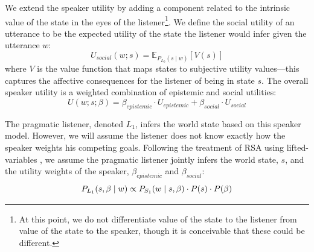 \documentclass[10pt,letterpaper]{article}
\newcommand{\denote}[1]{\mbox{ $[\![ #1 ]\!]$}}
\newcommand{\ndg}[1]{\textcolor{Green}{[ndg: #1]}}
\begin{document}
We extend the speaker utility by adding a component related to the intrinsic value of the state in the eyes of the listener\footnote{At this point, we do not differentiate value of the state to the listener from value of the state to the speaker, though it is conceivable that these could be different.}.
%
We define the social utility of an utterance to be the expected utility of the state the listener would infer given the utterance $w$: 
%
$$
U_{social}(w; s) = \mathbb{E}_{P_{L_0}(s \mid w)}[V(s)]
$$
%
where $V$ is the value function that maps states to subjective utility values---this captures the affective consequences for the listener of being in state $s$. 
The overall speaker utility is a weighted combination of epistemic and social utilities:
$$
U(w;s; \beta) = \beta_{epistemic}\cdot U_{epistemic} + \beta_{social} \cdot U_{social}
$$
%
%

The pragmatic listener, denoted $L_1$, infers the world state based on this speaker model. 
However, we will assume the listener does not know exactly how the speaker weights his competing goals.
Following the treatment of RSA using lifted-variables \cite{GoodmanLassiter2015, BergenEtAl2016, Kao2014, Degen2015},
we assume the pragmatic listener jointly infers the world state, $s$, and the utility weights of the speaker, $\beta_{epistemic}$ and $\beta_{social}$:
$$
P_{L_1}(s, \beta \mid w)\propto P_{S_1}(w \mid s, \beta)\cdot P(s) \cdot P(\beta) \label{eq:L1}\\
$$
\end{document}
